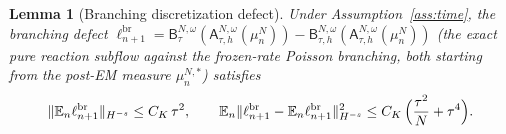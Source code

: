 \documentclass[a4paper,fleqn]{cas-sc}
\newtheorem{lemma}[theorem]{Lemma}
\theoremstyle{definition}
\theoremstyle{remark}
\begin{document}
\begin{lemma}[Branching discretization defect]\label{lem:branch}
Under Assumption~\ref{ass:time}, the branching defect
$\ell^{\mathrm{br}}_{n+1}=\mathsf B^{N,\omega}_\tau(\mathsf A^{N,\omega}_{\tau,h}(\mu^N_n))
-\mathsf B^{N,\omega}_{\tau,h}(\mathsf A^{N,\omega}_{\tau,h}(\mu^N_n))$ (the exact
pure reaction subflow against the frozen-rate Poisson branching, both starting
from the post-EM measure $\mu^{N,*}_n$) satisfies
\begin{equation}\label{eq:branch}
\|\mathbb E_n\ell^{\mathrm{br}}_{n+1}\|_{H^{-s}}\le C_K\,\tau^2,
\qquad
\mathbb E_n\|\ell^{\mathrm{br}}_{n+1}-\mathbb E_n\ell^{\mathrm{br}}_{n+1}\|_{H^{-s}}^2
\le C_K\,\Bigl(\frac{\tau^2}{N}+\tau^4\Bigr).
\end{equation}
\end{lemma}
\end{document}
